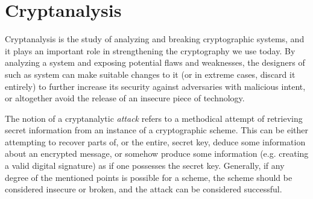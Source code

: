 
\section{Cryptanalysis}
Cryptanalysis is the study of analyzing and breaking cryptographic systems, and it plays an important role in strengthening the cryptography we use today.
By analyzing a system and exposing potential flaws and weaknesses, the designers of such as system can make suitable changes to it (or in extreme cases, discard it entirely) to further 
increase its security against adversaries with malicious intent, or altogether avoid the release of an insecure piece of technology.

The notion of a cryptanalytic \textit{attack} refers to a methodical attempt of retrieving secret information from an instance of a cryptographic scheme.
This can be either attempting to recover parts of, or the entire, secret key, deduce some information about an encrypted message, or somehow produce 
some information (e.g. creating a valid digital signature) as if one possesses the secret key. Generally, if any degree of the mentioned points is possible for a scheme, 
the scheme should be considered insecure or broken, and the attack can be considered successful.

